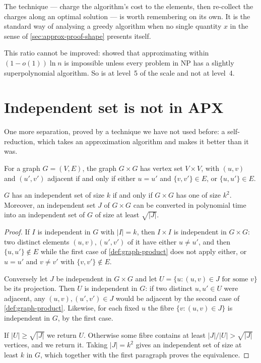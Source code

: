 The technique --- charge the algorithm's cost to the elements, then re-collect
the charges along an optimal solution --- is worth remembering on its own. It is
the standard way of analysing a greedy algorithm when no single quantity $x$ in
the sense of \cref{sec:approx-proof-shape} presents itself.

This ratio cannot be improved: \citet{Feige1998} showed that approximating
 within $(1-o(1))\ln n$ is impossible unless every problem in
\textrm{NP} has a slightly superpolynomial algorithm. So  is at
level~5 of the scale and not at level~4.

\section{Independent set is not in APX}
\label{sec:is-not-apx}

One more separation, proved by a technique we have not used before: a
self-reduction, which takes an approximation algorithm and makes it better than
it was.

\begin{definition}\label{def:graph-product}
For a graph $G = (V,E)$, the graph $G \times G$ has vertex set $V \times V$,
with $(u,v)$ and $(u',v')$ adjacent if and only if either $u = u'$ and
$\{v,v'\} \in E$, or $\{u,u'\} \in E$.
\end{definition}

\begin{lemma}\label{lem:graph-product-is}
$G$ has an independent set of size $k$ if and only if $G \times G$ has one of
size $k^2$. Moreover, an independent set $J$ of $G \times G$ can be converted in
polynomial time into an independent set of $G$ of size at least $\sqrt{|J|}$.
\end{lemma}

\begin{proof}
If $I$ is independent in $G$ with $|I| = k$, then $I \times I$ is independent in
$G \times G$: two distinct elements $(u,v),(u',v')$ of it have either $u \ne u'$,
and then $\{u,u'\} \notin E$ while the first case of \cref{def:graph-product}
does not apply either, or $u = u'$ and $v \ne v'$ with $\{v,v'\} \notin E$.

Conversely let $J$ be independent in $G \times G$ and let
$U = \{u : (u,v) \in J \text{ for some } v\}$ be its projection. Then $U$ is
independent in $G$: if two distinct $u,u' \in U$ were adjacent, any
$(u,v),(u',v') \in J$ would be adjacent by the second case of
\cref{def:graph-product}. Likewise, for each fixed $u$ the fibre
$\{v : (u,v) \in J\}$ is independent in $G$, by the first case.

If $|U| \ge \sqrt{|J|}$ we return $U$. Otherwise some fibre contains at least
$|J|/|U| > \sqrt{|J|}$ vertices, and we return it. Taking $|J| = k^2$ gives an
independent set of size at least $k$ in $G$, which together with the first
paragraph proves the equivalence.
\end{proof}

